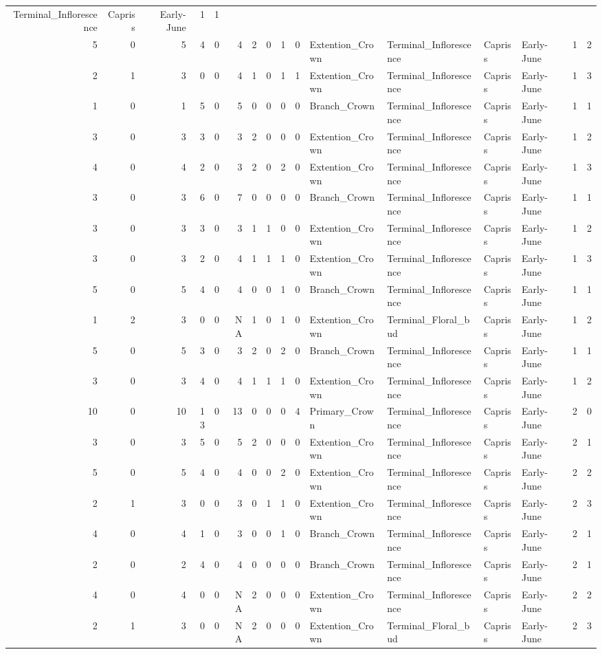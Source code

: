 \documentclass[]{article}
\begin{document}
\begin{longtable}[]{@{}rrrrrrrrrrllllrl@{}}
Terminal\_Inflorescence & Capriss & Early-June & 1 & 1\tabularnewline
5 & 0 & 5 & 4 & 0 & 4 & 2 & 0 & 1 & 0 & Extention\_Crown &
Terminal\_Inflorescence & Capriss & Early-June & 1 & 2\tabularnewline
2 & 1 & 3 & 0 & 0 & 4 & 1 & 0 & 1 & 1 & Extention\_Crown &
Terminal\_Inflorescence & Capriss & Early-June & 1 & 3\tabularnewline
1 & 0 & 1 & 5 & 0 & 5 & 0 & 0 & 0 & 0 & Branch\_Crown &
Terminal\_Inflorescence & Capriss & Early-June & 1 & 1\tabularnewline
3 & 0 & 3 & 3 & 0 & 3 & 2 & 0 & 0 & 0 & Extention\_Crown &
Terminal\_Inflorescence & Capriss & Early-June & 1 & 2\tabularnewline
4 & 0 & 4 & 2 & 0 & 3 & 2 & 0 & 2 & 0 & Extention\_Crown &
Terminal\_Inflorescence & Capriss & Early-June & 1 & 3\tabularnewline
3 & 0 & 3 & 6 & 0 & 7 & 0 & 0 & 0 & 0 & Branch\_Crown &
Terminal\_Inflorescence & Capriss & Early-June & 1 & 1\tabularnewline
3 & 0 & 3 & 3 & 0 & 3 & 1 & 1 & 0 & 0 & Extention\_Crown &
Terminal\_Inflorescence & Capriss & Early-June & 1 & 2\tabularnewline
3 & 0 & 3 & 2 & 0 & 4 & 1 & 1 & 1 & 0 & Extention\_Crown &
Terminal\_Inflorescence & Capriss & Early-June & 1 & 3\tabularnewline
5 & 0 & 5 & 4 & 0 & 4 & 0 & 0 & 1 & 0 & Branch\_Crown &
Terminal\_Inflorescence & Capriss & Early-June & 1 & 1\tabularnewline
1 & 2 & 3 & 0 & 0 & NA & 1 & 0 & 1 & 0 & Extention\_Crown &
Terminal\_Floral\_bud & Capriss & Early-June & 1 & 2\tabularnewline
5 & 0 & 5 & 3 & 0 & 3 & 2 & 0 & 2 & 0 & Branch\_Crown &
Terminal\_Inflorescence & Capriss & Early-June & 1 & 1\tabularnewline
3 & 0 & 3 & 4 & 0 & 4 & 1 & 1 & 1 & 0 & Extention\_Crown &
Terminal\_Inflorescence & Capriss & Early-June & 1 & 2\tabularnewline
10 & 0 & 10 & 13 & 0 & 13 & 0 & 0 & 0 & 4 & Primary\_Crown &
Terminal\_Inflorescence & Capriss & Early-June & 2 & 0\tabularnewline
3 & 0 & 3 & 5 & 0 & 5 & 2 & 0 & 0 & 0 & Extention\_Crown &
Terminal\_Inflorescence & Capriss & Early-June & 2 & 1\tabularnewline
5 & 0 & 5 & 4 & 0 & 4 & 0 & 0 & 2 & 0 & Extention\_Crown &
Terminal\_Inflorescence & Capriss & Early-June & 2 & 2\tabularnewline
2 & 1 & 3 & 0 & 0 & 3 & 0 & 1 & 1 & 0 & Extention\_Crown &
Terminal\_Inflorescence & Capriss & Early-June & 2 & 3\tabularnewline
4 & 0 & 4 & 1 & 0 & 3 & 0 & 0 & 1 & 0 & Branch\_Crown &
Terminal\_Inflorescence & Capriss & Early-June & 2 & 1\tabularnewline
2 & 0 & 2 & 4 & 0 & 4 & 0 & 0 & 0 & 0 & Branch\_Crown &
Terminal\_Inflorescence & Capriss & Early-June & 2 & 1\tabularnewline
4 & 0 & 4 & 0 & 0 & NA & 2 & 0 & 0 & 0 & Extention\_Crown &
Terminal\_Inflorescence & Capriss & Early-June & 2 & 2\tabularnewline
2 & 1 & 3 & 0 & 0 & NA & 2 & 0 & 0 & 0 & Extention\_Crown &
Terminal\_Floral\_bud & Capriss & Early-June & 2 & 3\tabularnewline

\end{longtable}
\end{document}

